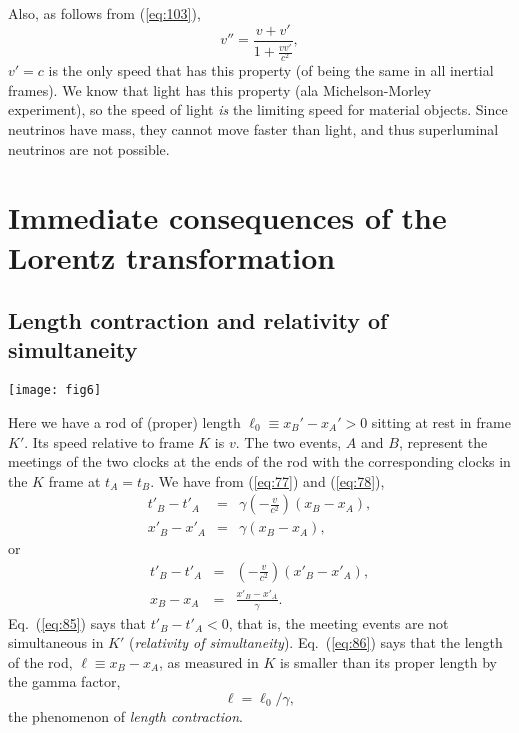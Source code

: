 \documentclass[twocolumn,preprintnumbers,amsmath,amssymb,final]{revtex4}
\def\BEq{\begin{equation}}
\def\EEq{\end{equation}}
\def\BEqA{\begin{eqnarray}}
\def\EEqA{\end{eqnarray}}
\begin{document}
Also, as follows from (\ref{eq:103}), 
\[
v''=\frac{v+v'}{1+\frac{vv'}{c^2}},
\]
$v'=c$ is the only speed that has this property (of being the same in all inertial frames). 
We know that light has this property (ala Michelson-Morley 
experiment), so the speed of light {\it is} the limiting speed for material objects. Since neutrinos have mass, they cannot move faster than light, and thus superluminal neutrinos are not possible.







\section*{Immediate consequences of the Lorentz transformation}

\subsection{Length contraction and relativity of simultaneity}


\texttt{[image: fig6]}

\vskip5pt

Here we have a rod of (proper) length $\ell_0 \equiv  x_{B}'-x_{A}'>0$ 
sitting at rest in frame $K'$. 
Its speed relative to frame $K$ is $v$. The two events, $A$ and $B$, represent the 
meetings of the two clocks at the ends of the rod with the corresponding clocks in the $K$ frame at
$t_{A}=t_{B}$. We have 
from (\ref{eq:77}) and (\ref{eq:78}),
\BEqA
t'_{B}-t'_{A}&=&
\gamma
\left(-\frac{v}{c^2}\right)\left(x_{B}-x_{A}\right),
\\
x'_{B}-x'_{A}&=&
\gamma
\left(x_{B}-x_{A}\right),
\EEqA
or
\BEqA
\label{eq:85}
t'_{B}-t'_{A}&=&
\left(-\frac{v}{c^2}\right)\left(x'_{B}-x'_{A}\right),
\\
\label{eq:86}
x_{B}-x_{A}&=&\frac{x'_{B}-x'_{A}}{\gamma}.
\EEqA
Eq.\ (\ref{eq:85}) says that $t'_{B}-t'_{A}<0$, that is, the meeting events are not simultaneous in 
$K'$ ({\it relativity of simultaneity}). Eq.\ (\ref{eq:86}) says that the length of the rod, 
$\ell \equiv x_{B}-x_{A}$, as measured in $K$ is smaller than its proper length by the gamma factor,
\BEq
\ell = {\ell_0/\gamma},
\EEq
the phenomenon of {\it length contraction}.
\end{document}
